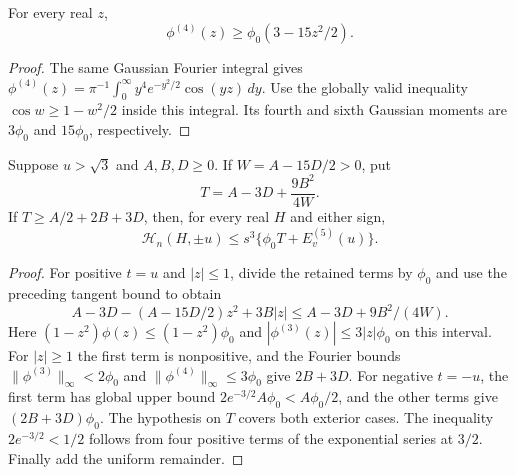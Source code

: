 \begin{lemma}
For every real $z$,
\[
 \phi^{(4)}(z)\ge\phi_0(3-15z^2/2).
\]
\end{lemma}
\begin{proof}
The same Gaussian Fourier integral gives
$\phi^{(4)}(z)=\pi^{-1}\int_0^\infty
y^4e^{-y^2/2}\cos(yz)\,dy$.
Use the globally valid inequality $\cos w\ge1-w^2/2$ inside
this integral. Its fourth and sixth Gaussian moments are $3\phi_0$
and $15\phi_0$, respectively.
\end{proof}

\begin{lemma}\label{support:envelope}
Suppose $u>\sqrt3$ and $A,B,D\ge0$. If
$W=A-15D/2>0$, put
\[
 T=A-3D+\frac{9B^2}{4W}.
\]
If $T\ge A/2+2B+3D$, then, for every real $H$ and either sign,
\[
 \mathcal H_n(H,\pm u)\le s^3\{\phi_0 T+E^{(5)}_v(u)\}.
\]
\end{lemma}
\begin{proof}
For positive $t=u$ and $|z|\le1$, divide the retained terms by
$\phi_0$ and use the preceding tangent bound to obtain
\[
 A-3D-(A-15D/2)z^2+3B|z|
 \le A-3D+9B^2/(4W).
\]
Here $(1-z^2)\phi(z)\le(1-z^2)\phi_0$ and
$|\phi^{(3)}(z)|\le3|z|\phi_0$ on this interval.
For $|z|\ge1$ the first term is nonpositive, and the Fourier bounds
$\|\phi^{(3)}\|_\infty<2\phi_0$ and
$\|\phi^{(4)}\|_\infty\le3\phi_0$ give $2B+3D$.
For negative $t=-u$, the first term has global upper bound
$2e^{-3/2}A\phi_0<A\phi_0/2$, and the other terms give
$(2B+3D)\phi_0$. The hypothesis on $T$ covers both exterior cases.
The inequality $2e^{-3/2}<1/2$ follows from four positive terms of
the exponential series at $3/2$. Finally add the uniform remainder.
\end{proof}

